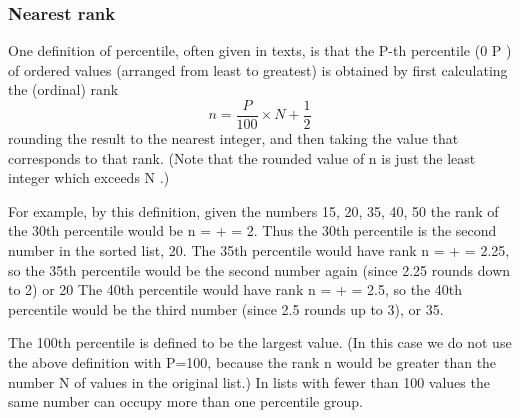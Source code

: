 
\begin{frame}
\frametitle{Nearest rank}
One definition of percentile, often given in texts, is that the P-th percentile (0 \le P ) of 
ordered values (arranged from least to greatest) is obtained by first calculating the (ordinal) rank
 \[n = \frac{P}{100} \times N + \frac{1}{2}\]
rounding the result to the nearest integer, and then taking the value that corresponds to that rank. (Note that the rounded value of n is just the least integer which exceeds   \times N .)
\end{frame}
For example, by this definition, given the numbers
15, 20, 35, 40, 50
the rank of the 30th percentile would be
n =   +  = 2.
Thus the 30th percentile is the second number in the sorted list, 20.
The 35th percentile would have rank
n =   +  = 2.25,
so the 35th percentile would be the second number again (since 2.25 rounds down to 2) or 20
The 40th percentile would have rank
n =   +  = 2.5,
so the 40th percentile would be the third number (since 2.5 rounds up to 3), or 35.

The 100th percentile is defined to be the largest value. (In this case we do not use the above definition with P=100, because the rank n would be greater than the number N of values in the original list.)
In lists with fewer than 100 values the same number can occupy more than one percentile group.
